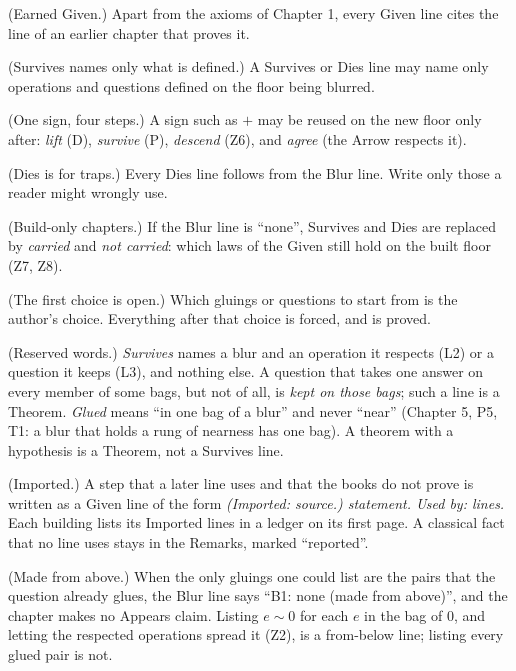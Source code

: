 \begin{lines}
\item[\lab{C1}] (Earned Given.) Apart from the axioms of Chapter 1, every Given line cites the line of an earlier chapter that proves it.
\item[\lab{C2}] (Survives names only what is defined.) A Survives or Dies line may name only operations and questions defined on the floor being blurred.
\item[\lab{C3}] (One sign, four steps.) A sign such as $+$ may be reused on the new floor only after: \emph{lift} (D), \emph{survive} (P), \emph{descend} (Z6), and \emph{agree} (the Arrow respects it).
\item[\lab{C4}] (Dies is for traps.) Every Dies line follows from the Blur line. Write only those a reader might wrongly use.
\item[\lab{C5}] (Build-only chapters.) If the Blur line is ``none'', Survives and Dies are replaced by \emph{carried} and \emph{not carried}: which laws of the Given still hold on the built floor (Z7, Z8).
\item[\lab{C6}] (The first choice is open.) Which gluings or questions to start from is the author's choice. Everything after that choice is forced, and is proved.
\item[\lab{C7}] (Reserved words.) \emph{Survives} names a blur and an operation it respects (L2) or a question it keeps (L3), and nothing else. A question that takes one answer on every member of some bags, but not of all, is \emph{kept on those bags}; such a line is a Theorem. \emph{Glued} means ``in one bag of a blur'' and never ``near'' (Chapter 5, P5, T1: a blur that holds a rung of nearness has one bag). A theorem with a hypothesis is a Theorem, not a Survives line.
\item[\lab{C8}] (Imported.) A step that a later line uses and that the books do not prove is written as a Given line of the form \emph{(Imported: source.) statement. Used by: lines.} Each building lists its Imported lines in a ledger on its first page. A classical fact that no line uses stays in the Remarks, marked ``reported''.
\item[\lab{C9}] (Made from above.) When the only gluings one could list are the pairs that the question already glues, the Blur line says ``B1: none (made from above)'', and the chapter makes no Appears claim. Listing $e \sim 0$ for each $e$ in the bag of $0$, and letting the respected operations spread it (Z2), is a from-below line; listing every glued pair is not.
\end{lines}

